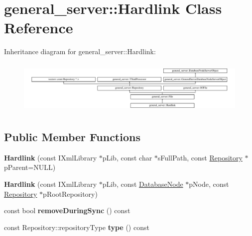 \hypertarget{classgeneral__server_1_1Hardlink}{\section{general\-\_\-server\-:\-:\-Hardlink \-Class \-Reference}
\label{classgeneral__server_1_1Hardlink}
}
\-Inheritance diagram for general\-\_\-server\-:\-:\-Hardlink\-:\begin{figure}[H]
\begin{center}
\leavevmode
\includegraphics[height=2.621723cm]{classgeneral__server_1_1Hardlink}
\end{center}
\end{figure}
\subsection*{\-Public \-Member \-Functions}
\begin{DoxyCompactItemize}
\item 
\hypertarget{classgeneral__server_1_1Hardlink_abfada1ee9966c30c900d4204ae7dde23}{{\bfseries \-Hardlink} (const \-I\-Xml\-Library $\ast$p\-Lib, const char $\ast$s\-Full\-Path, const \hyperlink{classgeneral__server_1_1Repository}{\-Repository} $\ast$p\-Parent=\-N\-U\-L\-L)}\label{classgeneral__server_1_1Hardlink_abfada1ee9966c30c900d4204ae7dde23}

\item 
\hypertarget{classgeneral__server_1_1Hardlink_aea0a81b89c7bc3ba96a336212d3d2944}{{\bfseries \-Hardlink} (const \-I\-Xml\-Library $\ast$p\-Lib, const \hyperlink{classgeneral__server_1_1DatabaseNode}{\-Database\-Node} $\ast$p\-Node, const \hyperlink{classgeneral__server_1_1Repository}{\-Repository} $\ast$p\-Root\-Repository)}\label{classgeneral__server_1_1Hardlink_aea0a81b89c7bc3ba96a336212d3d2944}

\item 
\hypertarget{classgeneral__server_1_1Hardlink_a2e398006eabf0830b4282634efe39e63}{const bool {\bfseries remove\-During\-Sync} () const }\label{classgeneral__server_1_1Hardlink_a2e398006eabf0830b4282634efe39e63}

\item 
\hypertarget{classgeneral__server_1_1Hardlink_afad7f26300ed8ecdef4ae756af33269e}{const \-Repository\-::repository\-Type {\bfseries type} () const }\label{classgeneral__server_1_1Hardlink_afad7f26300ed8ecdef4ae756af33269e}

\end{DoxyCompactItemize}
